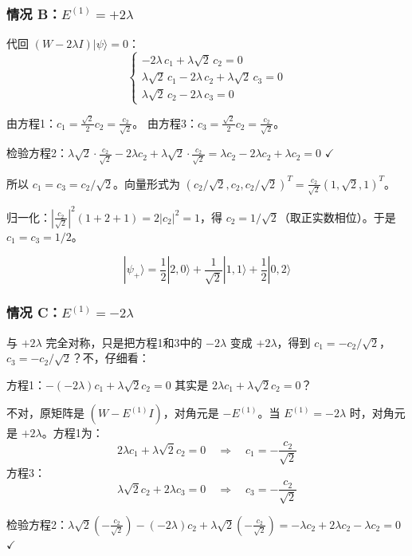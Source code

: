 \subsubsection*{情况 B：$E^{(1)} = +2\lambda$}

代回 $(W - 2\lambda I)|\psi\rangle = 0$：
\[
\begin{cases}
-2\lambda \, c_1 + \lambda\sqrt{2} \, c_2 = 0 \\
\lambda\sqrt{2} \, c_1 - 2\lambda \, c_2 + \lambda\sqrt{2} \, c_3 = 0 \\
\lambda\sqrt{2} \, c_2 - 2\lambda \, c_3 = 0
\end{cases}
\]

由方程1：$c_1 = \frac{\sqrt{2}}{2} c_2 = \frac{c_2}{\sqrt{2}}$。
由方程3：$c_3 = \frac{\sqrt{2}}{2} c_2 = \frac{c_2}{\sqrt{2}}$。

检验方程2：$\lambda\sqrt{2} \cdot \frac{c_2}{\sqrt{2}} - 2\lambda c_2 + \lambda\sqrt{2} \cdot \frac{c_2}{\sqrt{2}} = \lambda c_2 - 2\lambda c_2 + \lambda c_2 = 0$ $\checkmark$

所以 $c_1 = c_3 = c_2/\sqrt{2}$。向量形式为 $(c_2/\sqrt{2}, c_2, c_2/\sqrt{2})^T = \frac{c_2}{\sqrt{2}}(1, \sqrt{2}, 1)^T$。

归一化：$|\frac{c_2}{\sqrt{2}}|^2 (1 + 2 + 1) = 2|c_2|^2 = 1$，得 $c_2 = 1/\sqrt{2}$（取正实数相位）。于是 $c_1 = c_3 = 1/2$。

\[
\boxed{|\psi_+\rangle = \frac{1}{2}|2,0\rangle + \frac{1}{\sqrt{2}}|1,1\rangle + \frac{1}{2}|0,2\rangle}
\]

\subsubsection*{情况 C：$E^{(1)} = -2\lambda$}

与 $+2\lambda$ 完全对称，只是把方程1和3中的 $-2\lambda$ 变成 $+2\lambda$，得到 $c_1 = -c_2/\sqrt{2}$，$c_3 = -c_2/\sqrt{2}$？不，仔细看：

方程1：$-(-2\lambda)c_1 + \lambda\sqrt{2}c_2 = 0$ 其实是 $2\lambda c_1 + \lambda\sqrt{2}c_2 = 0$？

不对，原矩阵是 $(W - E^{(1)}I)$，对角元是 $-E^{(1)}$。当 $E^{(1)} = -2\lambda$ 时，对角元是 $+2\lambda$。方程1为：
\[
2\lambda c_1 + \lambda\sqrt{2} c_2 = 0 \quad \Rightarrow \quad c_1 = -\frac{c_2}{\sqrt{2}}
\]
方程3：
\[
\lambda\sqrt{2} c_2 + 2\lambda c_3 = 0 \quad \Rightarrow \quad c_3 = -\frac{c_2}{\sqrt{2}}
\]

检验方程2：$\lambda\sqrt{2}(-\frac{c_2}{\sqrt{2}}) - (-2\lambda)c_2 + \lambda\sqrt{2}(-\frac{c_2}{\sqrt{2}}) = -\lambda c_2 + 2\lambda c_2 - \lambda c_2 = 0$ $\checkmark$

